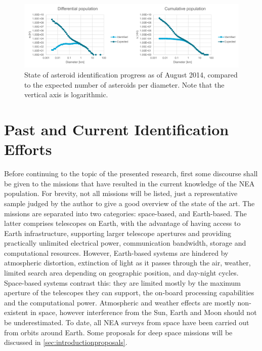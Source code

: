 \begin{figure}[htbp]
 \centering
 \includegraphics[width=1.0\textwidth]{img/population_estimates.pdf}
 \caption{State of asteroid identification progress as of August 2014, compared to the expected number of asteroids per diameter. Note that the vertical axis is logarithmic. \cite{HarrisPopulation}}
 \label{fig:population_estimates}
\end{figure}


\section{Past and Current Identification Efforts}
\label{sec:introductionidentification}

Before continuing to the topic of the presented research, first some discourse shall be given to the missions that have resulted in the current knowledge of the NEA population. For brevity, not all missions will be listed, just a representative sample judged by the author to give a good overview of the state of the art. The missions are separated into two categories: space-based, and Earth-based. The latter comprises telescopes on Earth, with the advantage of having access to Earth infrastructure, supporting larger telescope apertures and providing practically unlimited electrical power, communication bandwidth, storage and computational resources. However, Earth-based systems are hindered by atmospheric distortion, extinction of light as it passes through the air, weather, limited search area depending on geographic position, and day-night cycles. Space-based systems contrast this: they are limited mostly by the maximum aperture of the telescopes they can support, the on-board processing capabilities and the computational power. Atmospheric and weather effects are mostly non-existent in space, however interference from the Sun, Earth and Moon should not be underestimated. To date, all NEA surveys from space have been carried out from orbits around Earth. Some proposals for deep space missions will be discussed in \autoref{sec:introductionproposals}.\\

